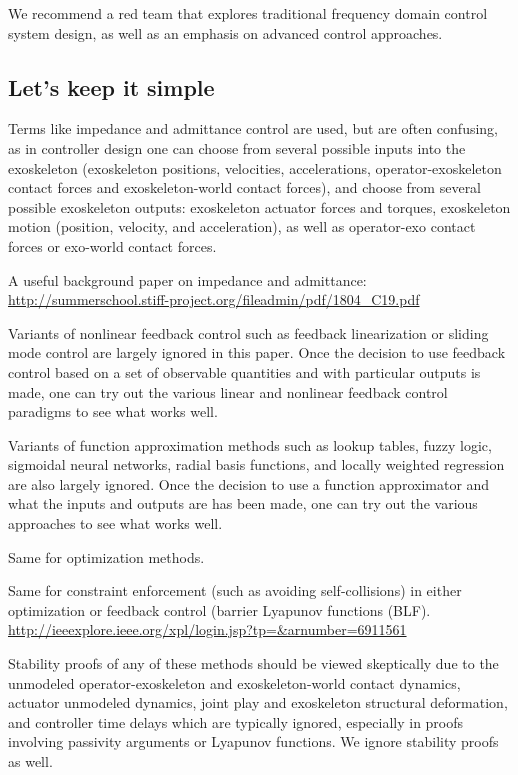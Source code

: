 \documentclass[letterpaper,12pt,fullpage]{article}
\begin{document}
We recommend a red team that explores traditional 
frequency domain control system
design, as well as an emphasis on advanced control approaches.

\subsection{Let's keep it simple}

Terms like impedance and admittance control are used, but are often confusing,
as in controller design one can choose from several possible
inputs into the exoskeleton (exoskeleton positions,
velocities, accelerations, operator-exoskeleton contact forces and
exoskeleton-world contact forces), and choose from several possible exoskeleton
outputs: exoskeleton actuator forces and torques, exoskeleton
motion (position, velocity, and acceleration), as well as operator-exo
contact forces or exo-world contact forces.

A useful background paper on impedance and admittance:\\
\url{http://summerschool.stiff-project.org/fileadmin/pdf/1804_C19.pdf}

Variants of nonlinear feedback control such as feedback linearization or
sliding mode control are largely ignored in this paper.
Once the decision to use feedback control
based on a set of observable quantities and with particular outputs is made,
one can try out the various linear and nonlinear feedback control paradigms
to see what works well.

Variants of function approximation methods such as lookup tables, fuzzy logic,
sigmoidal neural networks, radial basis functions, and locally weighted regression
are also largely ignored. Once the decision to use a function approximator
and what the inputs and outputs are has been made, one can try out the various
approaches to see what works well.

Same for optimization methods.

Same for constraint enforcement (such as avoiding self-collisions)
in either optimization or feedback control (barrier
Lyapunov functions (BLF).\\
\url{http://ieeexplore.ieee.org/xpl/login.jsp?tp=&arnumber=6911561}

Stability proofs of any of these methods should be viewed skeptically due
to the unmodeled operator-exoskeleton and exoskeleton-world contact dynamics, 
actuator unmodeled dynamics, joint play and exoskeleton
structural deformation, and controller
time delays which are typically ignored, especially in proofs involving
passivity arguments or Lyapunov functions.
We ignore stability proofs as well.
\end{document}
